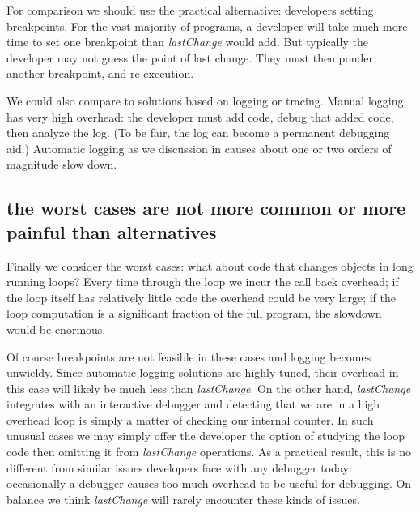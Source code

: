 \documentclass[preprint]{sigplanconf}
\begin{document}
For comparison we should use the practical alternative: developers
setting breakpoints. For the vast majority of programs, a developer
will take much more time to set one breakpoint than
\textit{lastChange} would add. But typically the developer may not
guess the point of last change. They must then ponder another
breakpoint, and re-execution. 

We could also compare to solutions based on logging or tracing. Manual
logging has very high overhead: the developer must add code, debug
that added code, then analyze the log. (To be fair, the log can become
a permanent debugging aid.) Automatic logging as we discussion in
 causes about one or two orders of magnitude slow down. 

\subsection{the worst cases are not more common or more painful than alternatives}

Finally we consider the worst cases: what about code that changes
objects in long running loops? Every time through the loop we incur
the call back overhead; if the loop itself has relatively little code
the overhead could be very large; if the loop computation is a
significant fraction of the full program, the slowdown would be
enormous. 

Of course breakpoints are not feasible in these cases and logging
becomes unwieldy. Since automatic logging solutions are highly tuned,
their overhead in this case will likely be much less than
\textit{lastChange}. On the other hand, \textit{lastChange} integrates
with an interactive debugger and detecting that we are in a high
overhead loop is simply a matter of checking our internal counter. In
such unusual cases we may simply offer the developer the option of
studying the loop code then omitting it from \textit{lastChange}
operations. As a practical result, this is no different from similar
issues developers face with any debugger today: occasionally a
debugger causes too much overhead to be useful for debugging. On
balance we think \textit{lastChange} will rarely encounter these kinds
of issues.


\end{document}
